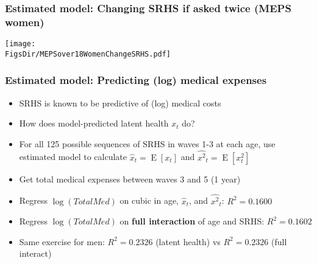 \documentclass[aspectratio=169]{beamer}
\newcommand{\E}{\operatorname{E}}
\newcommand{\FigsDir}{../Figures}
\begin{document}
\begin{frame}\frametitle{Estimated model: Changing SRHS if asked twice (MEPS women)}
\begin{center}
	\texttt{[image: \\FigsDir/MEPSover18WomenChangeSRHS.pdf]}
\end{center}
\end{frame}


\begin{frame}\frametitle{Estimated model: Predicting (log) medical expenses}
\begin{itemize}
\item <1->SRHS is known to be predictive of (log) medical costs

\item <1->How does model-predicted latent health $x_t$ do?

\item <2->For all 125 possible sequences of SRHS in waves 1-3 at each age, use estimated model to calculate $\hat{x}_t = \E[x_t]$ and $\widehat{x^2}_t = \E[x_t^2]$

\item <2->Get total medical expenses between waves 3 and 5 (1 year)

\item <3->Regress $\log(TotalMed)$ on cubic in age, $\hat{x}_t$, and $\widehat{x^2}_t$: $R^2 = 0.1600$

\item <3->Regress $\log(TotalMed)$ on \textbf{full interaction} of age and SRHS: $R^2 = 0.1602$

\item <4->Same exercise for men: $R^2 = 0.2326$ (latent health) vs $R^2 = 0.2326$ (full interact)
\end{itemize}
\end{frame}
\end{document}
